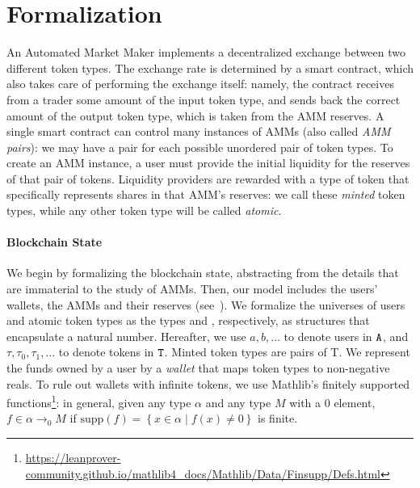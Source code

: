 \section{Formalization}
\label{sec:blockchain}

An Automated Market Maker implements a decentralized exchange between two different token types. The exchange rate is determined by a smart contract, which also takes care of performing the exchange itself: namely, the contract receives from a trader some amount of the input token type, and sends back the correct amount of the output token type, which is taken from the AMM reserves. A single smart contract can control many instances of AMMs (also called \emph{AMM pairs}): we may have a pair for each possible unordered pair of token types. To create an AMM instance, a user must provide the initial liquidity for the reserves of that pair of tokens. Liquidity providers are rewarded with a type of token that specifically represents shares in that AMM's reserves: we call these \emph{minted} token types, while any other token type will be called \emph{atomic}.

\paragraph*{Blockchain State}

We begin by formalizing the blockchain state, abstracting from the details that are immaterial to the study of AMMs. 
Then, our model includes the users' wallets, the AMMs and their reserves
(see~).
We formalize the universes of users and atomic token types as the types  and , respectively, as structures that encapsulate a natural number.
Hereafter, we use $a, b, \ldots$ to denote users in $\code{A}$, 
and $\tau, \tau_0, \tau_1, \ldots$ to denote tokens in $\code{T}$.
Minted token types are pairs of \code T. 
We represent the funds owned by a user by a \emph{wallet} that maps token types to non-negative reals.
%
To rule out wallets with infinite tokens,
we use Mathlib's finitely supported functions\footnote{\url{https://leanprover-community.github.io/mathlib4_docs/Mathlib/Data/Finsupp/Defs.html}}: 
in general,
given any type $\alpha$ and any type $M$ with a $0$ element, $f \in \alpha \to_0 M$ if $\mathrm{supp}\left(f\right) = \left\{x \in \alpha \mid f\left(x\right) \neq 0\right\}$ is finite.  

